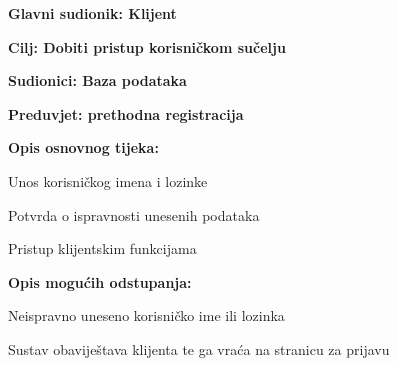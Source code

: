 					\noindent {}
					\begin{packed_item}
						
						\item \textbf{Glavni sudionik: Klijent}
						\item  \textbf{Cilj: Dobiti pristup korisničkom sučelju} 
						\item  \textbf{Sudionici: Baza podataka}
						\item  \textbf{Preduvjet: prethodna registracija}
						\item  \textbf{Opis osnovnog tijeka: }
						
						\item[] \begin{packed_enum}
							
							\item Unos korisničkog imena i lozinke
							\item Potvrda o ispravnosti unesenih podataka
							\item Pristup klijentskim funkcijama
							
						\end{packed_enum}
						
						\item  \textbf{Opis mogućih odstupanja:}
						
						\item[] \begin{packed_item}
							
							\item[2.a] Neispravno uneseno korisničko ime ili lozinka
							\item[] \begin{packed_enum}
								
								\item Sustav obaviještava klijenta te ga vraća na stranicu za prijavu
								
							\end{packed_enum}
							
						\end{packed_item}
						
					\end{packed_item}
				
